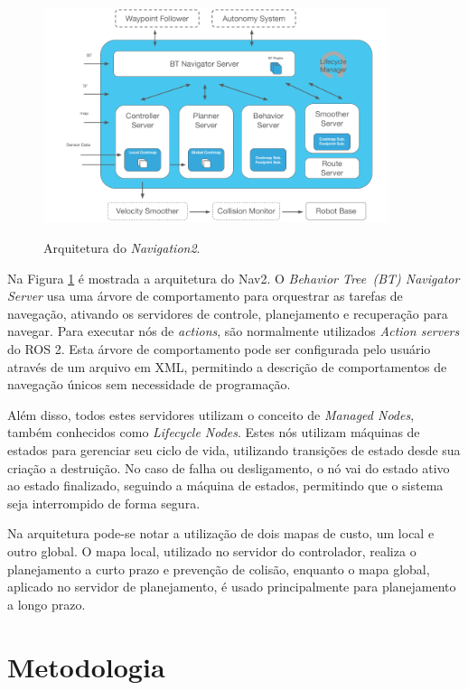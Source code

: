 \documentclass[repeatfields,xlists,xpacks,oneside,yearsonly]{ufrgscca}
\begin{document}
\begin{figure}[htbp]
    {
        \centering
        \caption{Arquitetura do \textit{Navigation2}.}
        \label{fig:nav2_arc}
        \includegraphics[width=0.9\textwidth]{nav2_architecture.png}\\
    }
    {}
\end{figure}

Na Figura \ref{fig:nav2_arc} é mostrada a arquitetura do Nav2.
O \textit{Behavior Tree~(BT) Navigator Server} usa uma árvore de comportamento para
orquestrar as tarefas de navegação, ativando os servidores de controle, planejamento e
recuperação para navegar.
Para executar nós de \textit{actions}, são normalmente utilizados
\textit{Action servers} do ROS 2.
Esta árvore de comportamento pode ser configurada pelo usuário através de um arquivo
em XML, permitindo a descrição de comportamentos de navegação únicos sem
necessidade de programação.

Além disso, todos estes servidores utilizam o conceito de \textit{Managed Nodes},
também conhecidos como \textit{Lifecycle Nodes}.
Estes nós utilizam máquinas de estados para gerenciar seu ciclo de vida, utilizando
transições de estado desde sua criação a destruição.
No caso de falha ou desligamento, o nó vai do estado ativo ao estado finalizado,
seguindo a máquina de estados, permitindo que o sistema seja interrompido
de forma segura.

Na arquitetura pode-se notar a utilização de dois mapas de custo, um local e
outro global.
O mapa local, utilizado no servidor do controlador, realiza o planejamento
a curto prazo e prevenção de colisão, enquanto o mapa global,
aplicado no servidor de planejamento, é usado principalmente
para planejamento a longo prazo.

\chapter{Metodologia}
\label{desenvolvimento}
\end{document}
